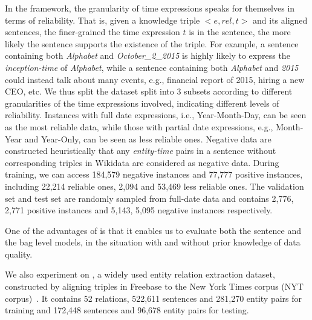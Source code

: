 In the \DS framework, the granularity of time expressions speaks for themselves in
terms of reliability. That is, given a knowledge triple $<$$e,rel,t$$>$ and its
aligned sentences,  the  finer-grained the time expression $t$ is in the sentence,
the more likely the sentence  supports the existence of the triple.
For example, a sentence containing both \emph{Alphabet} and \emph{October\_2\_2015} is highly likely to express the \emph{inception-time} of \emph{Alphabet}, while a sentence containing both \emph{Alphabet} and \emph{2015} could instead talk  about many events, e.g.,  financial report of 2015, hiring a new CEO, etc.
We thus split the dataset split into
3 subsets according to different granularities of the time expressions involved, indicating different levels of reliability.
Instances with full date expressions, i.e., Year-Month-Day, can be seen as the most reliable data, while those with
partial date expressions, e.g., Month-Year and Year-Only, can be seen as less
reliable ones.  Negative data are constructed  heuristically that any
\emph{entity-time} pairs in a sentence without corresponding triples in Wikidata are considered as negative data. 
During training, we can access  184,579 negative
instances and  77,777 positive instances, including 22,214 reliable
ones, 2,094 and 53,469 less reliable ones. The validation set and test set are randomly sampled from full-date data and contains
2,776, 2,771 positive instances and 5,143, 5,095 negative instances respectively. 


One of the advantages of \TimeRE is that it enables us to evaluate both the sentence and the bag level models, in the situation with and without prior knowledge of data quality.

We also experiment on \EntityRE, a widely used entity
relation extraction dataset, constructed by aligning triples
in Freebase to the New York Times corpus (NYT
corpus)~\cite{riedel2010modeling}. It contains 52 relations, 522,611 sentences and 281,270
entity pairs for training and  172,448 sentences and 96,678 entity pairs for
testing. 


